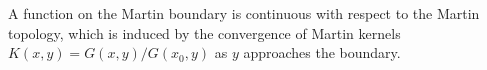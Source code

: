 A function on the Martin boundary is continuous with respect to the Martin topology, which is induced by the convergence of Martin kernels $K(x, y) = G(x, y)/G(x_0, y)$ as $y$ approaches the boundary.
